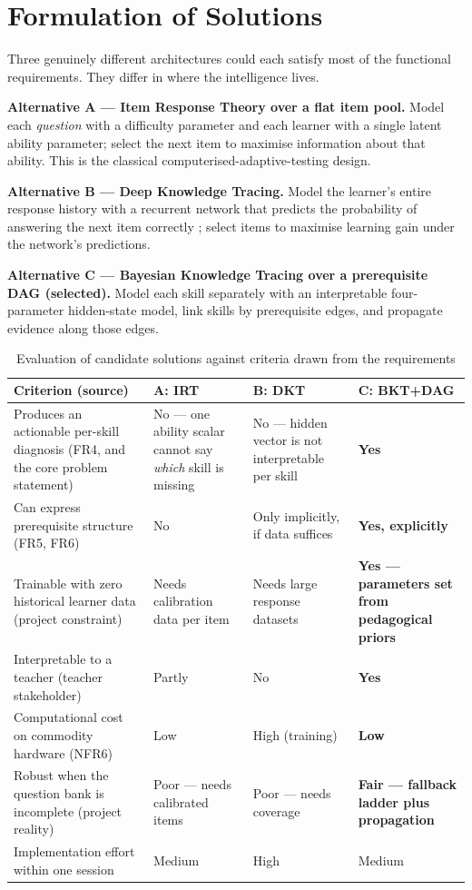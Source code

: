 \section{Formulation of Solutions}
\label{sec:alternatives}

Three genuinely different architectures could each satisfy most of the
functional requirements. They differ in where the intelligence lives.

\textbf{Alternative A --- Item Response Theory over a flat item pool.} Model each
\emph{question} with a difficulty parameter and each learner with a single
latent ability parameter; select the next item to maximise information about
that ability. This is the classical computerised-adaptive-testing design.

\textbf{Alternative B --- Deep Knowledge Tracing.} Model the learner's entire
response history with a recurrent network that predicts the probability of
answering the next item correctly \cite{piech2015deep}; select items to
maximise learning gain under the network's predictions.

\textbf{Alternative C --- Bayesian Knowledge Tracing over a prerequisite DAG
(selected).} Model each skill separately with an interpretable four-parameter
hidden-state model, link skills by prerequisite edges, and propagate evidence
along those edges.

\begin{table}[H]
  \singlespacing
  \centering
  \caption{Evaluation of candidate solutions against criteria drawn from the requirements}
  \label{tab:alternatives}
  \begin{tabularx}{\textwidth}{>{\hsize}Y>{\hsize}Y>{\hsize}Y>{\hsize}Y}
    \toprule
    Criterion (source) & A: IRT & B: DKT & C: BKT+DAG \\
    \midrule
    Produces an actionable per-skill diagnosis (FR4, and the core problem statement) & No --- one ability scalar cannot say \emph{which} skill is missing & No --- hidden vector is not interpretable per skill & \textbf{Yes} \\
    Can express prerequisite structure (FR5, FR6) & No & Only implicitly, if data suffices & \textbf{Yes, explicitly} \\
    Trainable with zero historical learner data (project constraint) & Needs calibration data per item & Needs large response datasets & \textbf{Yes --- parameters set from pedagogical priors} \\
    Interpretable to a teacher (teacher stakeholder) & Partly & No & \textbf{Yes} \\
    Computational cost on commodity hardware (NFR6) & Low & High (training) & \textbf{Low} \\
    Robust when the question bank is incomplete (project reality) & Poor --- needs calibrated items & Poor --- needs coverage & \textbf{Fair --- fallback ladder plus propagation} \\
    Implementation effort within one session & Medium & High & Medium \\
    \bottomrule
  \end{tabularx}
\end{table}

